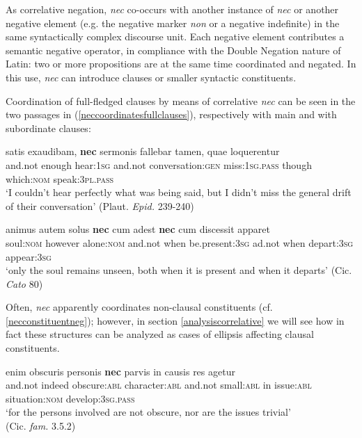 \documentclass[output=paper,modfonts,nonflat,citecolor=brown,
showindex
]{langsci/langscibook}
\begin{document}
As correlative negation, {\emph{nec}} co-occurs with another instance of {\emph{nec}} or another negative element (e.g. the negative marker {\emph{non}} or a negative indefinite) in the same syntactically complex discourse unit. Each negative element contributes a semantic negative operator, in compliance with the Double Negation nature of Latin: two or more propositions are at the same time coordinated and negated. In this use, {\emph{nec}} can introduce clauses or smaller syntactic constituents. 

Coordination of full-fledged clauses by means of correlative {\emph{nec}} can be seen in the two passages in (\ref{neccoordinatesfullclauses}), respectively with main and with subordinate clauses:

{\begin{exe}
\ex \label{neccoordinatesfullclauses}
\begin{xlist}
\ex {} satis exaudibam, {\textbf{nec}} sermonis fallebar tamen, quae loquerentur\\
and.not enough hear:{\textsc{1sg}} and.not conversation:{\textsc{gen}} miss:{\textsc{1sg.pass}} though which:{\textsc{nom}} speak:{\textsc{3pl.pass}} \\

`I couldn't hear perfectly what was being said, but I didn't miss the general drift of their conversation' (Plaut. {\emph{Epid.}} 239-240)

\ex \gll animus autem solus {\textbf{nec}} cum adest {\textbf{nec}} cum discessit apparet\\
soul:{\textsc{nom}} however alone:{\textsc{nom}} and.not when be.present:{\textsc{3sg}} ad.not when depart:{\textsc{3sg}} appear:{\textsc{3sg}}\\

`only the soul remains unseen, both when it is present and when it departs' (Cic. {\emph{Cato}} 80)
\end{xlist}
\end{exe}}


\noindent Often, {\emph{nec}} apparently coordinates non-clausal constituents (cf. \ref{necconstituentneg}); however, in section \ref{analysiscorrelative} we will see how in fact these structures can be analyzed as cases of ellipsis affecting clausal constituents. 

{\begin{exe}
\ex \label{necconstituentneg}  enim obscuris personis {\textbf{nec}} parvis in causis res agetur\\
and.not indeed obscure:{\textsc{abl}} character:{\textsc{abl}} and.not small:{\textsc{abl}} in issue:{\textsc{abl}} situation:{\textsc{nom}} develop:{\textsc{3sg.pass}}\\

`for the persons involved are not obscure, nor are the issues trivial'\\(Cic. {\emph{fam.}} 3.5.2)
\end{exe}}
\end{document}
